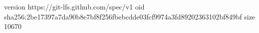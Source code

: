version https://git-lfs.github.com/spec/v1
oid sha256:2be17397a7da90b8e7bf8f256fbebcdde03fcf9974a3fd89202363102bf849bf
size 10670
